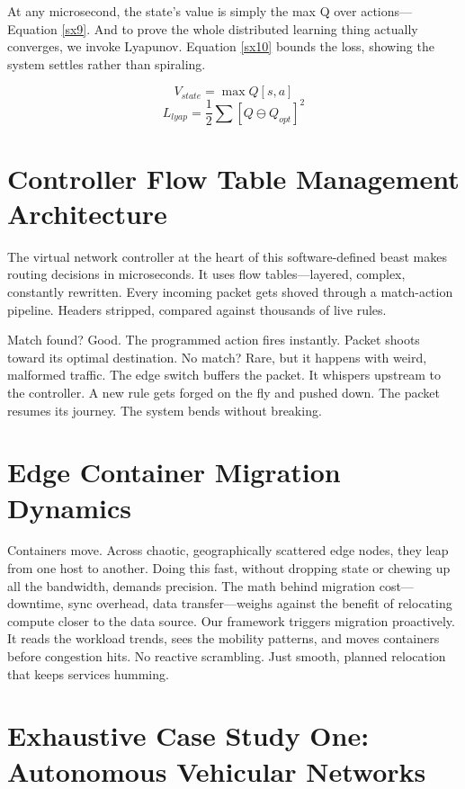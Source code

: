 \documentclass[a4paper,fleqn]{cas-dc}
\numberwithin{equation}{section}
\begin{document}
At any microsecond, the state's value is simply the max Q over actions—Equation \ref{sx9}. And to prove the whole distributed learning thing actually converges, we invoke Lyapunov. Equation \ref{sx10} bounds the loss, showing the system settles rather than spiraling.

\begin{equation} V_{state} = \max Q[s, a] \label{sx9} \end{equation}
\begin{equation} L_{lyap} = \frac{1}{2} \sum [ Q \ominus Q_{opt} ]^{2} \label{sx10} \end{equation}

\section{Controller Flow Table Management Architecture}

The virtual network controller at the heart of this software-defined beast makes routing decisions in microseconds. It uses flow tables—layered, complex, constantly rewritten. Every incoming packet gets shoved through a match-action pipeline. Headers stripped, compared against thousands of live rules.

Match found? Good. The programmed action fires instantly. Packet shoots toward its optimal destination. No match? Rare, but it happens with weird, malformed traffic. The edge switch buffers the packet. It whispers upstream to the controller. A new rule gets forged on the fly and pushed down. The packet resumes its journey. The system bends without breaking.

\section{Edge Container Migration Dynamics}

Containers move. Across chaotic, geographically scattered edge nodes, they leap from one host to another. Doing this fast, without dropping state or chewing up all the bandwidth, demands precision. The math behind migration cost—downtime, sync overhead, data transfer—weighs against the benefit of relocating compute closer to the data source. Our framework triggers migration proactively. It reads the workload trends, sees the mobility patterns, and moves containers before congestion hits. No reactive scrambling. Just smooth, planned relocation that keeps services humming.

\section{Exhaustive Case Study One: Autonomous Vehicular Networks}
\end{document}

